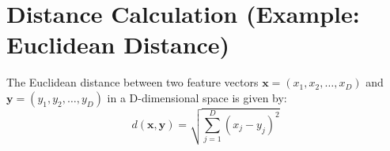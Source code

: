 \documentclass{article}
\begin{document}
\section{Distance Calculation (Example: Euclidean Distance)}

The Euclidean distance between two feature vectors $\mathbf{x} = (x_1, x_2, \dots, x_D)$ and $\mathbf{y} = (y_1, y_2, \dots, y_D)$ in a D-dimensional space is given by:
\[
d(\mathbf{x}, \mathbf{y}) = \sqrt{\sum_{j=1}^{D} (x_j - y_j)^2}
\]
\end{document}

